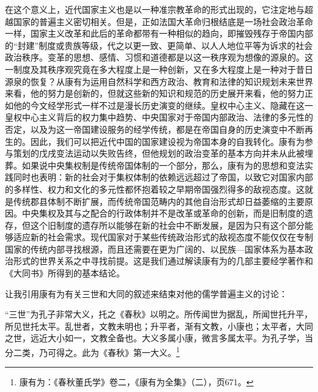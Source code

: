 \documentclass[a4paper, 12pt, openright]{ctexbook}
\renewenvironment{quote}
  {\list{}{\rightmargin2\ccwd \leftmargin2\ccwd \itemindent=2\ccwd \listparindent=2\ccwd}%
   \item\relax\small\kaishu\color{black}}
  {\endlist}
\begin{document}
在这个意义上，近代国家主义也是以一种准宗教革命的形式出现的，它注定地与超越国家的普遍主义密切相关。但是，正如法国大革命归根结底是一场社会政治革命一样，国家主义改革和此后的革命都带有一种相似的趋向，即摧毁残存于帝国内部的“封建”制度或贵族等级，代之以更一致、更简单、以人人地位平等为诉求的社会政治秩序。变革的思想、感情、习惯和道德都是以这一秩序观为想像的源泉的。这一制度及其秩序观究竟在多大程度上是一种创新，又在多大程度上是一种对于昔日源泉的恢复？从康有为运用自然科学和西方政治、教育和法律的知识规划未来世界来看，他的努力是创新的，但就这些新的知识和规范的历史展开来看，他的努力正如他的今文经学形式一样不过是漫长历史演变的继续。皇权中心主义、隐藏在这一皇权中心主义背后的权力集中趋势、中央国家对于帝国内部政治、法律的多元性的否定，以及为这一帝国建设服务的经学传统，都是在帝国自身的历史演变中不断再生的。因此，我们可以把近代中国的国家建设视为帝国本身的自我转化。康有为参与策划的戊戌变法运动以失败告终，但他规划的政治变革的基本方向并未从此被埋葬。如果说中央集权制是传统帝国体制的一个部分，那么，康有为的思想和变法实践同时也表明：新的社会对于集权体制的依赖远远超过了帝国，以致它对国家内部的多样性、权力和文化的多元性都怀抱着较之早期帝国强烈得多的敌视态度。这就是传统郡县体制不断扩展，而传统帝国范畴内的其他自治形式却日益萎缩的主要原因。中央集权及其与之配合的行政体制并不是改革或革命的创新，而是旧制度的遗存，但这个旧制度的遗存所以能够在新的社会中不断发展，是因为只有这个部分能够适应新的社会需求。现代国家对于某些传统政治形式的敌视态度不能仅仅在专制国家的传统内部寻找根源，而且还需要在更为广阔的、以民族—国家体系为基本政治形式的世界关系之中寻找前提。这是我们通过解读康有为的几部主要经学著作和《大同书》所得到的基本结论。

让我引用康有为有关三世和大同的叙述来结束对他的儒学普遍主义的讨论：

\begin{quote}
“三世”为孔子非常大义，托之《春秋》以明之。所传闻世为据乱，所闻世托升平，所见世托太平。乱世者，文教未明也；升平者，渐有文教，小康也；太平者，大同之世，远近大小如一，文教全备也。大义多属小康，微言多属太平。为孔子学，当分二类，乃可得之。此为《春秋》第一大义。\footnote{康有为：《春秋董氏学》卷二，《康有为全集》（二），页671。}
\end{quote}
\end{document}
